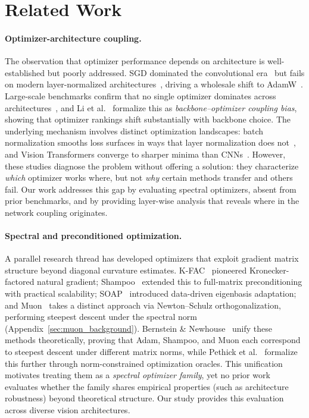 \section{Related Work}
\label{sec:related_work}

\paragraph{Optimizer-architecture coupling.}
The observation that optimizer performance depends on architecture is well-established but poorly addressed. SGD dominated the convolutional era~\cite{he2016deep} but fails on modern layer-normalized architectures~\cite{liu2022convnet,touvron2021training}, driving a wholesale shift to AdamW~\cite{loshchilov2019decoupled}. Large-scale benchmarks confirm that no single optimizer dominates across architectures~\cite{choi2020optimizers,schmidt2021crowdedvalley}, and Li et al.~\cite{li2024bocb} formalize this as \emph{backbone--optimizer coupling bias}, showing that optimizer rankings shift substantially with backbone choice. The underlying mechanism involves distinct optimization landscapes: batch normalization smooths loss surfaces in ways that layer normalization does not~\cite{santurkar2018how}, and Vision Transformers converge to sharper minima than CNNs~\cite{chen2022vit}. However, these studies diagnose the problem without offering a solution: they characterize \emph{which} optimizer works where, but not \emph{why} certain methods transfer and others fail. Our work addresses this gap by evaluating spectral optimizers, absent from prior benchmarks, and by providing layer-wise analysis that reveals where in the network coupling originates.

\paragraph{Spectral and preconditioned optimization.}
A parallel research thread has developed optimizers that exploit gradient matrix structure beyond diagonal curvature estimates. K-FAC~\cite{martens2015kfac} pioneered Kronecker-factored natural gradient; Shampoo~\cite{gupta2018shampoo,anil2021scalable} extended this to full-matrix preconditioning with practical scalability; SOAP~\cite{vyas2025soap} introduced data-driven eigenbasis adaptation; and Muon~\cite{jordan2024muon} takes a distinct approach via Newton--Schulz orthogonalization, performing steepest descent under the spectral norm (Appendix~\ref{sec:muon_background}). Bernstein \& Newhouse~\cite{bernstein2024old} unify these methods theoretically, proving that Adam, Shampoo, and Muon each correspond to steepest descent under different matrix norms, while Pethick et al.~\cite{pethick2025training} formalize this further through norm-constrained optimization oracles. This unification motivates treating them as a \emph{spectral optimizer family}, yet no prior work evaluates whether the family shares empirical properties (such as architecture robustness) beyond theoretical structure. Our study provides this evaluation across diverse vision architectures.

